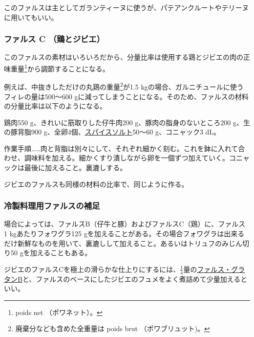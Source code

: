 \begin{recette}
このファルスは主としてガランティーヌに使うが、パテアンクルートやテリーヌに用いてもいい。

\hypertarget{farce-froide-c}{%
\subsubsection{ファルス C （鶏とジビエ）}\label{farce-froide-c}}



このファルスの素材はいろいろだから、分量比率は使用する鶏とジビエの肉の正味重量\footnote{poids
  net （ポワネット）。}から調節することになる。

例えば、中抜きしただけの丸鶏の重量\footnote{廃棄分なども含めた全重量は
  poids brut （ポワブリュット)。}が1.5
kgの場合、ガルニチュールに使うフィレの量は500〜600
gに減ってしまうことになる。そのため、ファルスの材料の分量比率は以下のようになる。

鶏肉550 g、きれいに筋取りした仔牛肉200 g、豚肉の脂身のないところ200
g、生の豚背脂900
g、全卵4個、\protect\hyperlink{sel-epice}{スパイスソルト}50〜60
g、コニャック3 dL。

作業手順\ldots{}\ldots{}肉と背脂は別々にして、それぞれ細かく刻む。これを鉢に入れて合わせ、調味料を加える。細かくすり潰しながら卵を一個ずつ加えていく。コニャックは最後に加えること。裏漉しする。

ジビエのファルスも同様の材料の比率で、同じように作る。

\hypertarget{observation-sur-les-farces}{%
\subsubsection{冷製料理用ファルスの補足}\label{observation-sur-les-farces}}

場合によっては、ファルスB（仔牛と豚）およびファルスC（鶏）に、ファルス 1
kgあたりフォワグラ125
gを加えることがある。その場合フォワグラは出来るだけ新鮮なものを用いて、裏漉しして加えること。あるいはトリュフのみじん切り50
gを加えることもある。

ジビエのファルスCを極上の滑らかな仕上りにするには、\(\frac{1}{4}\)量の\protect\hyperlink{farce-gratin-b}{ファルス・グラタンB}と、ファルスのベースにしたジビエのフュメをよく煮詰めて少量加えるといい。
\end{recette}
